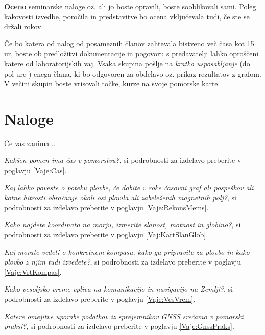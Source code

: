 \textbf{Oceno} seminarske naloge oz. ali jo boste opravili, boste sooblikovali sami. Poleg kakovosti izvedbe, poročila in predstavitve bo ocena vključevala tudi, če ste se držali rokov. 

Če bo katera od nalog od posameznih članov zahtevala bistveno več časa kot 15 ur, boste ob predložitvi dokumentacije in pogovoru s predavatelji lahko oproščeni katere od laboratorijskih vaj. Vsaka skupina pošlje na \textit{kratko usposabljanje} (do pol ure ) enega člana, ki bo odgovoren za obdelavo oz. prikaz rezultatov z grafom. V večini skupin boste vrisovali točke, kurze na svoje pomorske karte.


\section*{Naloge}
Če vas zanima ..
\begin{prob}
	\label{Nal:SplNavCas}
	 \textit{Kakšen pomen ima čas v pomorstvu?}, si podrobnosti za izdelavo preberite v poglavju \ref{Vaje:Cas}.
\end{prob}

\begin{prob}
	\label{Nal:SplNavMem}
	\textit{Kaj lahko poveste o poteku plovbe, če dobite v roke časovni graf ali pospeškov ali kotne hitrosti obračanje okoli osi plovila ali zabeleženih magnetnih polj?}, si podrobnosti za izdelavo preberite v poglavju \ref{Vaje:RekonsMems}.
\end{prob}


\begin{prob}
	\label{Nal:SplNavKart}
	\textit{Kako najdete koordinato na morju, izmerite slanost, motnost in globino?}, si podrobnosti za izdelavo preberite v poglavju \ref{Vaj:KartSlanGlob}.
\end{prob}

\begin{prob}
	\label{Nal:SplNavKomp}
	\textit{Kaj morate vedeti o konkretnem kompasu, kako ga pripravite za plovbo in kako plovbo z njim tudi izvedete?}, si podrobnosti za izdelavo preberite v poglavju \ref{Vaje:VrtKompas}.
\end{prob}

\begin{prob}
	\label{Nal:SplNavVes}
	\textit{Kako vesoljsko vreme vpliva na komunikacijo in navigacijo na Zemlji?}, si podrobnosti za izdelavo preberite v poglavju \ref{Vaje:VesVrem}.  
\end{prob}

\begin{prob}
	\label{Nal:SplNavGns}
	\textit{Katere omejitve uporabe podatkov iz sprejemnikov GNSS srečamo v pomorski praksi?}, si podrobnosti za izdelavo preberite v poglavju \ref{Vaje:GnssPraks}.
\end{prob}




%
